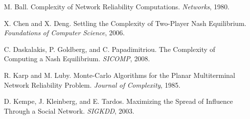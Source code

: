 \documentclass{article}
\theoremstyle{plain}
\begin{document}
\begin{thebibliography}{9}

    M. Ball.
    Complexity of Network Reliability Computations.
    \emph{Networks}, 1980.

    X. Chen and X. Deng.
    Settling the Complexity of Two-Player Nash Equilibrium.
    \emph{Foundations of Computer Science}, 2006.

    C. Daskalakis, P. Goldberg, and C. Papadimitriou.
    The Complexity of Computing a Nash Equilibrium.
    \emph{SICOMP}, 2008.

    R. Karp and M. Luby.
    Monte-Carlo Algorithms for the Planar Multiterminal Network Reliability Problem.
    \emph{Journal of Complexity}, 1985.

    D. Kempe, J. Kleinberg, and E. Tardos.
    Maximizing the Spread of Inﬂuence Through a Social Network.
    \emph{SIGKDD}, 2003.


\end{thebibliography}
\end{document}
